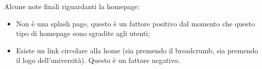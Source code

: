 Alcune note finali riguardanti la homepage:
	\begin{itemize}
		\item Non è una splash page, questo è un fattore positivo dal momento che questo tipo di homepage sono sgradite agli utenti;
		\item Esiste un link circolare alla home (sia premendo il breadcrumb, sia premendo il logo dell'università). Questo è un fattore negativo.
	\end{itemize}